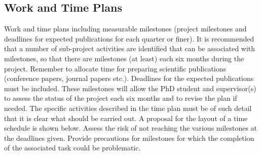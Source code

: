 \subsection{Work and Time Plans}
Work and time plans including measurable milestones (project milestones and deadlines for expected publications for each quarter or finer). It is recommended that a number of sub-project activities are identified that can be associated with milestones, so that there are milestones (at least) each six months during the project. Remember to allocate time for preparing scientific publications (conference papers, journal papers etc.). Deadlines for the expected publications must be included. These milestones will allow the PhD student and supervisor(s) to assess the status of the project each six months and to revise the plan if needed. The specific activities described in the time plan must be of such detail that it is clear what should be carried out. A proposal for the layout of a time schedule is shown below. Assess the risk of not reaching the various milestones at the deadlines given. Provide precautions for milestones for which the completion of the associated task could be problematic.
\\
\\
\scriptsize
\def \tabcolwidth {0.030\columnwidth}
